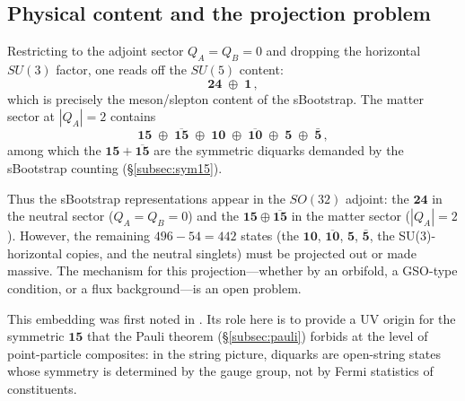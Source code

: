 \documentclass[12pt,a4paper]{article}
\begin{document}
\subsection{Physical content and the projection problem}
\label{subsec:so32_open}

Restricting to the adjoint sector $Q_A = Q_B = 0$ and dropping the
horizontal $SU(3)$ factor, one reads off the $SU(5)$ content:
\begin{equation}
\mathbf{24} \;\oplus\; \mathbf{1}\,,
\end{equation}
which is precisely the meson/slepton content of the sBootstrap.
The matter sector at $|Q_A| = 2$ contains
\begin{equation}
\mathbf{15} \;\oplus\; \overline{\mathbf{15}}
  \;\oplus\; \mathbf{10} \;\oplus\; \overline{\mathbf{10}}
  \;\oplus\; \mathbf{5} \;\oplus\; \bar{\mathbf{5}}\,,
\end{equation}
among which the $\mathbf{15} + \overline{\mathbf{15}}$ are
the symmetric diquarks demanded by the sBootstrap counting
(\S\ref{subsec:sym15}).

Thus the sBootstrap representations appear in the $SO(32)$
adjoint: the $\mathbf{24}$ in the neutral sector ($Q_A\!=\!Q_B\!=\!0$)
and the $\mathbf{15} \oplus \overline{\mathbf{15}}$ in the matter
sector ($|Q_A|\!=\!2$). However, the remaining $496 - 54 = 442$
states (the $\mathbf{10}$, $\overline{\mathbf{10}}$,
$\mathbf{5}$, $\bar{\mathbf{5}}$, the SU(3)-horizontal copies,
and the neutral singlets) must be projected out or made massive.
The mechanism for this projection---whether by an orbifold,
a GSO-type condition, or a flux background---is an open problem.

This embedding was first noted in \cite{Rivero2005}.  Its role
here is to provide a UV origin for the symmetric $\mathbf{15}$
that the Pauli theorem (\S\ref{subsec:pauli}) forbids at the
level of point-particle composites: in the string picture,
diquarks are open-string states whose symmetry is determined by
the gauge group, not by Fermi statistics of constituents.
\end{document}
